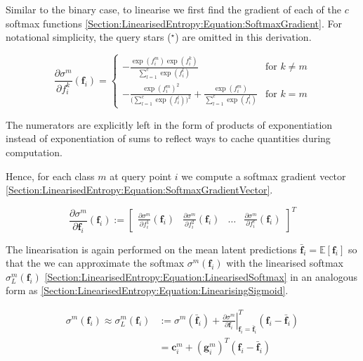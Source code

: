 \documentclass{article}
\renewcommand{\vec}[1]{\boldsymbol{#1}}
\begin{document}
			Similar to the binary case, to linearise we first find the gradient of each of the $c$ softmax functions \eqref{Section:LinearisedEntropy:Equation:SoftmaxGradient}. For notational simplicity, the query stars ($^{\star}$) are omitted in this derivation.
			
			\begin{equation}
				\frac{\partial \sigma^{m}}{\partial f^{k}_{i}}(\vec{f}_{i}) =
				\begin{cases} 
					- \frac{\exp(f^{m}_{i}) \exp(f^{k}_{i})}{\sum_{l = 1}^{c} \exp(f^{l}_{i})} & \text{for } k \neq m  \\
					- \frac{\exp(f^{m}_{i})^{2}}{\big(\sum_{l = 1}^{c} \exp(f^{l}_{i})\big)^{2}} + \frac{\exp(f^{m}_{i})}{\sum_{l = 1}^{c} \exp(f^{l}_{i})}& \text{for } k = m
				\end{cases}
			\label{Section:LinearisedEntropy:Equation:SoftmaxGradient}
			\end{equation}			
		
			The numerators are explicitly left in the form of products of exponentiation instead of exponentiation of sums to reflect ways to cache quantities during computation. 
			
			Hence, for each class $m$ at query point $i$ we compute a softmax gradient vector \eqref{Section:LinearisedEntropy:Equation:SoftmaxGradientVector}.
			
			\begin{equation}
				\frac{\partial \sigma^{m}}{\partial \vec{f}_{i}}(\vec{f}_{i}) := \begin{bmatrix} \frac{\partial \sigma^{m}}{\partial f^{1}_{i}}(\vec{f}_{i}) & \frac{\partial \sigma^{m}}{\partial f^{2}_{i}}(\vec{f}_{i}) & \dots & \frac{\partial \sigma^{m}}{\partial f^{c}_{i}}(\vec{f}_{i}) \end{bmatrix}^{T}
			\label{Section:LinearisedEntropy:Equation:SoftmaxGradientVector}
			\end{equation}
			
			The linearisation is again performed on the mean latent predictions $\bar{\vec{f}}_{i} = \mathbb{E}[\vec{f}_{i}]$ so that the we can approximate the softmax $\sigma^{m}(\vec{f}_{i})$ with the linearised softmax $\sigma^{m}_{L}(\vec{f}_{i})$ \eqref{Section:LinearisedEntropy:Equation:LinearisedSoftmax} in an analogous form as \eqref{Section:LinearisedEntropy:Equation:LinearisingSigmoid}.
			
			\begin{equation}
				\begin{aligned}
					\sigma^{m}(\vec{f}_{i}) \approx \sigma^{m}_{L}(\vec{f}_{i}) & := \sigma^{m}(\bar{\vec{f}}_{i}) + \left. \frac{\partial \sigma^{m}}{\partial \vec{f}_{i}} \right|^{T}_{\vec{f}_{i} = \bar{\vec{f}}_{i}} (\vec{f}_{i} - \bar{\vec{f}}_{i}) \\
					& = \vec{c}^{m}_{i} + (\vec{g}^{m}_{i})^{T} (\vec{f}_{i} - \bar{\vec{f}}_{i})
				\end{aligned}
			\label{Section:LinearisedEntropy:Equation:LinearisedSoftmax}
			\end{equation}
			
\end{document}

